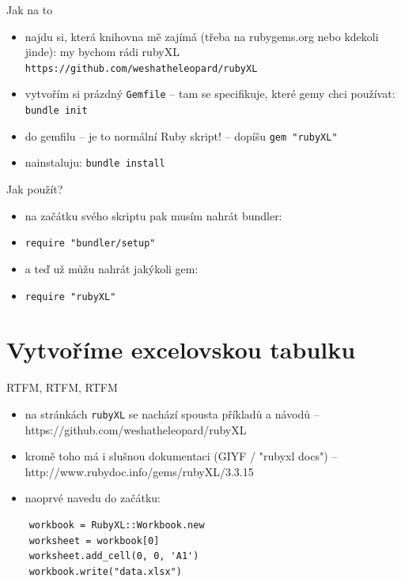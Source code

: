 \documentclass{beamer}
\begin{document}
\begin{frame}{Jak na to}
  \begin{itemize}
    \item najdu si, která knihovna mě zajímá (třeba na rubygems.org nebo kdekoli jinde): my bychom rádi rubyXL \texttt{https://github.com/weshatheleopard/rubyXL}
    \item vytvořím si prázdný \texttt{Gemfile} -- tam se specifikuje, které gemy chci používat: \texttt{bundle init}
    \item do gemfilu -- je to normální Ruby skript! -- dopíšu \texttt{gem "rubyXL"}
    \item nainstaluju: \texttt{bundle install}
  \end{itemize}
\end{frame}

\begin{frame}{Jak použít?}
  \begin{itemize}
    \item na začátku svého skriptu pak musím nahrát bundler:
    \item \texttt{require "bundler/setup"}
    \item a teď už můžu nahrát jakýkoli gem:
    \item \texttt{require "rubyXL"}
  \end{itemize}
\end{frame}

\section{Vytvoříme excelovskou tabulku}

\begin{frame}[fragile]{RTFM, RTFM, RTFM}
  \begin{itemize}
    \item na stránkách \texttt{rubyXL} se nachází spousta příkladů a návodů -- https://github.com/weshatheleopard/rubyXL
    \item kromě toho má i slušnou dokumentaci (GIYF / "rubyxl docs") -- http://www.rubydoc.info/gems/rubyXL/3.3.15
    \item naoprvé navedu do začátku:
  \end{itemize}
  {\tiny
  \begin{verbatim}
    workbook = RubyXL::Workbook.new
    worksheet = workbook[0]
    worksheet.add_cell(0, 0, 'A1')
    workbook.write("data.xlsx")
  \end{verbatim}
  }
\end{frame}
\end{document}

